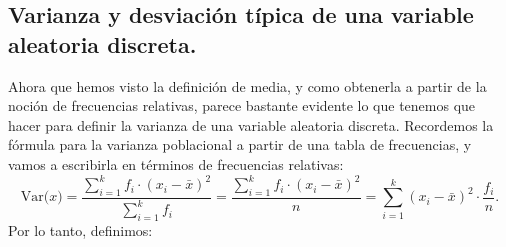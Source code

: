 \subsection{Varianza y desviación típica de una variable aleatoria discreta.}
\label{cap04:subsec:VarianzaDesvTipicaVariableAleatoriaDiscreta}

Ahora que hemos visto la definición de media, y como obtenerla a partir de la noción de frecuencias relativas, parece bastante evidente lo que tenemos que hacer para definir la varianza de una variable aleatoria discreta. Recordemos la fórmula para la varianza poblacional a partir de una tabla de frecuencias, y vamos a escribirla en términos de frecuencias relativas:
    \[
    \mbox{Var($x$)}=\dfrac{\displaystyle\sum_{i=1}^k{ f_i\cdot}(x_i-\bar x)^2}{{ \displaystyle\sum_{i=1}^k f_i}}=
    \dfrac{\displaystyle\sum_{i=1}^k{ f_i\cdot}(x_i-\bar x)^2}{n}=
    \displaystyle\sum_{i=1}^k{(x_i-\bar x)^2\cdot}\dfrac{f_i}{n}.
   \]
Por lo tanto, definimos:
%
%
    \begin{center}
    \end{center}
